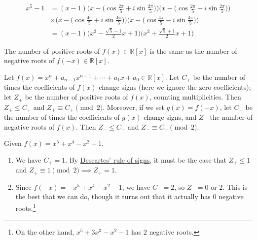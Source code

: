   \begin{example}
    \label{ex:factoring-x51-over-c}
    \begin{align*}
      x^5 - 1 & = (x-1) \bigg( x - \Big( \cos{\frac{2\pi}{5}} + i \sin{\frac{2\pi}{5}}\Big) \bigg) \bigg( x - \Big( \cos{\frac{2\pi}{5}} - i \sin{\frac{2\pi}{5}}\Big) \bigg) \\
      & \times \bigg( x - \Big( \cos{\frac{4\pi}{5}} + i \sin{\frac{4\pi}{5}}\Big) \bigg) \bigg( x - \Big( \cos{\frac{4\pi}{5}} - i \sin{\frac{4\pi}{5}}\Big) \bigg) \\
      & = (x-1) \bigg( x^2 - \frac{\sqrt{5} - 1}{2} x + 1\bigg) \bigg( x^2 + \frac{\sqrt{5} + 1}{2} x + 1\bigg) 
    \end{align*}
  \end{example}

  \begin{lemma}
    \label{thm:symmetry-on-sign-of-roots}
    The number of positive roots of $f(x) \in \mathbb{R}[x]$ is the same as the number of negative roots of $f(-x) \in \mathbb{R}[x]$.
  \end{lemma}

  \begin{theorem} 
    \label{thm:descartes}
    Let $f(x) = x^n + a_{n-1}x^{n-1} + \cdots + a_1x + a_0 \in \mathbb{R}[x]$. Let $C_+$ be the number of times the coefficients of $f(x)$ change signs (here we ignore the zero coefficients); let $Z_+$ be the number of positive roots of $f(x)$, counting multiplicities. Then $Z_+ \leq C_+$ and $Z_+ \equiv C_+ \pmod{2}$. Moreover, if we set $g(x) = f(-x)$, let $C_-$ be the number of times the coefficients of $g(x)$ change signs, and $Z_-$ the number of negative roots of $f(x)$. Then $Z_- \leq C_-$ and $Z_- \equiv C_- \pmod{2}$.
  \end{theorem}

  \begin{example}
    \label{ex:easy-way-to-find-number-of-positive-roots}
    Given $f(x) = x^5 + x^4 - x^2 - 1$, 
    \begin{enumerate}
      \item We have $C_+ = 1$. By \hyperref[thm:descartes]{Descartes' rule of signs}, it must be the case that $Z_+ \leq 1$ and $Z_+ \equiv 1 \pmod{2} \implies Z_+ = 1$. 
      \item Since $f(-x) = -x^5 + x^4 - x^2 - 1$, we have $C_- = 2$, so $Z_- = 0$ or $2$. This is the best that we can do, though it turns out that it actually has $0$ negative roots.\footnote{On the other hand, $x^5 + 3x^3 - x^2 - 1$ has 2 negative roots.} 
    \end{enumerate}
  \end{example}

